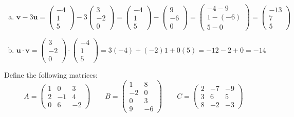 \documentclass[12pt,letterpaper]{exam}
\begin{document}
\begin{questions}
\begin{enumerate}[(a)]
\item 
	\[
	\mathbf{v} - 3 \mathbf{u}= \begin{pmatrix} -4 \\ 1 \\ 5 \end{pmatrix} - 3 \begin{pmatrix} 3 \\ -2 \\ 0 \end{pmatrix}= \begin{pmatrix} -4 \\ 1 \\ 5 \end{pmatrix} - \begin{pmatrix} 9 \\ -6 \\ 0 \end{pmatrix}= \begin{pmatrix} -4 - 9 \\ 1 - (-6) \\ 5 - 0 \end{pmatrix}= \begin{pmatrix} -13 \\ 7 \\ 5 \end{pmatrix}
	\] \pspace

\item 
	\[
	\mathbf{u} \cdot \mathbf{v}= \begin{pmatrix} 3 \\ -2 \\ 0 \end{pmatrix} \cdot \begin{pmatrix} -4 \\ 1 \\ 5 \end{pmatrix}= 3(-4) + (-2)1 + 0(5)= -12 - 2 + 0= -14
	\]
\end{enumerate}



\newpage
\question[10] Define the following matrices:
	\[
	A= \begin{pmatrix} 1 & 0 & 3 \\ 2 & -1 & 4 \\ 0 & 6 & -2 \end{pmatrix} \qquad
	B= \begin{pmatrix} 1 & 8 \\ -2 & 0 \\ 0 & 3 \\ 9 & -6 \end{pmatrix} \qquad
	C= \begin{pmatrix} 2 & -7 & -9 \\ 3 & 6 & 5 \\ 8 & -2 & -3 \end{pmatrix}
	\]


\end{questions}
\end{document}
